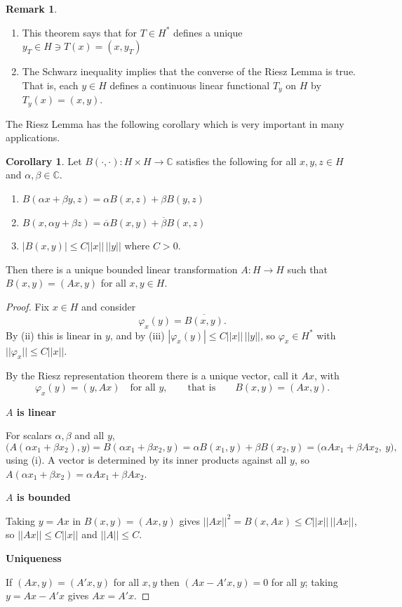\documentclass[11pt,a4paper]{article}
\theoremstyle{definition}
\newtheorem{coro}[thm]{Corollary}
\newtheorem*{remark}{Remark}
\newcommand{\subhead}[1]{%
  \par\medskip\noindent\textbf{#1}\par\nobreak\smallskip}
\begin{document}
\begin{remark}
\begin{enumerate}
\item[i] This theorem says that for $T\in H^*$ defines a unique\hspace{0.1cm} $y_T\in H\ni T(x)=(x,y_T)$
\item[ii] The Schwarz inequality implies that the converse of the Riesz Lemma is true. That is, each $y\in H$ defines a continuous linear functional $T_y$ on $H$ by $T_y(x)=(x,y)$.
\end{enumerate}
\end{remark}
The Riesz Lemma has the following corollary which is very important in many applications.


\begin{coro}
Let $B(\cdot,\cdot):H\times H\rightarrow \mathbb{C}$ satisfies the following for all $x,y,z\in H$ and $\alpha, \beta \in \mathbb{C}$.
\begin{enumerate}
\item[i] $B(\alpha x+\beta y,z)=\alpha B(x,z)+\beta B(y,z)$
\item[ii] $B(x,\alpha y+\beta z)=\overline{\alpha} B(x,y)+\overline{\beta} B(x,z)$
\item[iii] $|B(x,y)|\leq C||x||\,||y||$ where $C>0$.
\end{enumerate}
Then there is a unique bounded linear transformation $A:H\rightarrow H$ such
that $B(x,y)=(Ax,y)$ for all $x,y\in H$.
\end{coro}

\begin{proof}
Fix $x\in H$ and consider
$$\varphi_x(y)=\overline{B(x,y)} .$$
By (ii) this is linear in $y$, and by (iii) $|\varphi_x(y)|\leq C||x||\,||y||$,
so $\varphi_x\in H^*$ with $||\varphi_x||\leq C||x||$.

By the Riesz representation theorem there is a unique vector, call it $Ax$,
with
$$\varphi_x(y)=(y,Ax)\quad\text{for all }y, \qquad\text{that is}\qquad
B(x,y)=(Ax,y).$$

\subhead{$A$ is linear}
For scalars $\alpha,\beta$ and all $y$,
$$\big(A(\alpha x_1+\beta x_2),y\big)=B(\alpha x_1+\beta x_2,y)
=\alpha B(x_1,y)+\beta B(x_2,y)=\big(\alpha Ax_1+\beta Ax_2,\ y\big),$$
using (i). A vector is determined by its inner products against all $y$, so
$A(\alpha x_1+\beta x_2)=\alpha Ax_1+\beta Ax_2$.

\subhead{$A$ is bounded}
Taking $y=Ax$ in $B(x,y)=(Ax,y)$ gives $||Ax||^2=B(x,Ax)\leq C||x||\,||Ax||$,
so $||Ax||\leq C||x||$ and $||A||\leq C$.

\subhead{Uniqueness}
If $(Ax,y)=(A'x,y)$ for all $x,y$ then $(Ax-A'x,y)=0$ for all $y$; taking
$y=Ax-A'x$ gives $Ax=A'x$.
\end{proof}
\end{document}
